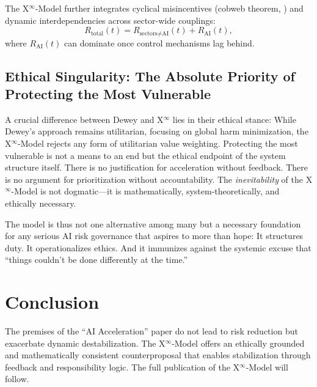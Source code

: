 \documentclass[11pt]{article}
\begin{document}
The X$^\infty$-Model further integrates cyclical misincentives (cobweb theorem, \citealp{Ezekiel1938}) and dynamic interdependencies across sector-wide couplings:
\begin{equation}
R_{\text{total}}(t) = R_{\text{sectors} \neq \text{AI}}(t) + R_{\text{AI}}(t),
\end{equation}
where $R_{\text{AI}}(t)$ can dominate once control mechanisms lag behind.

\subsection{Ethical Singularity: The Absolute Priority of Protecting the Most Vulnerable}
A crucial difference between Dewey and X$^\infty$ lies in their ethical stance: While Dewey’s approach remains utilitarian, focusing on global harm minimization, the X$^\infty$-Model rejects any form of utilitarian value weighting. Protecting the most vulnerable is not a means to an end but the ethical endpoint of the system structure itself. There is no justification for acceleration without feedback. There is no argument for prioritization without accountability. The \emph{inevitability} of the X$^\infty$-Model is not dogmatic—it is mathematically, system-theoretically, and ethically necessary.

The model is thus not one alternative among many but a necessary foundation for any serious AI risk governance that aspires to more than hope: It structures duty. It operationalizes ethics. And it immunizes against the systemic excuse that ``things couldn’t be done differently at the time.''

\section{Conclusion}
The premises of the ``AI Acceleration'' paper \citep{TrammellAschenbrenner2024} do not lead to risk reduction but exacerbate dynamic destabilization. The X$^\infty$-Model offers an ethically grounded and mathematically consistent counterproposal that enables stabilization through feedback and responsibility logic. The full publication of the X$^\infty$-Model will follow.
\end{document}
